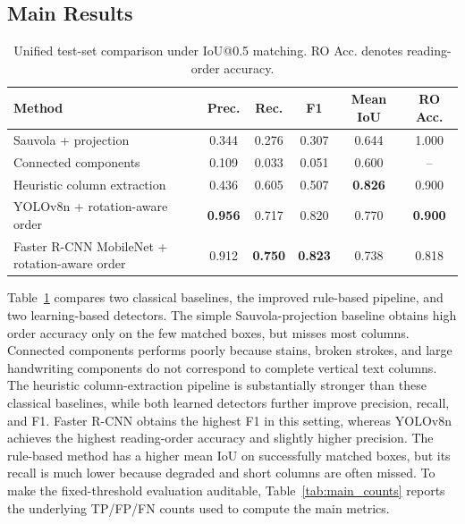 \documentclass[pdflatex,sn-mathphys-num]{sn-jnl}
\begin{document}
\subsection{Main Results}
\begin{table}
\centering
\scriptsize\setlength{\tabcolsep}{3pt}
\caption{Unified test-set comparison under IoU@0.5 matching. RO Acc. denotes reading-order accuracy.}
\label{tab:main_results}
\begin{tabular}{lccccc}
\toprule
Method & Prec. & Rec. & F1 & Mean IoU & RO Acc. \\
\midrule
Sauvola + projection & 0.344 & 0.276 & 0.307 & 0.644 & 1.000 \\
Connected components & 0.109 & 0.033 & 0.051 & 0.600 & -- \\
Heuristic column extraction & 0.436 & 0.605 & 0.507 & \textbf{0.826} & 0.900 \\
YOLOv8n + rotation-aware order & \textbf{0.956} & 0.717 & 0.820 & 0.770 & \textbf{0.900} \\
Faster R-CNN MobileNet + rotation-aware order & 0.912 & \textbf{0.750} & \textbf{0.823} & 0.738 & 0.818 \\
\bottomrule
\end{tabular}
\end{table}

Table~\ref{tab:main_results} compares two classical baselines, the improved rule-based pipeline, and two learning-based detectors. The simple Sauvola-projection baseline obtains high order accuracy only on the few matched boxes, but misses most columns. Connected components performs poorly because stains, broken strokes, and large handwriting components do not correspond to complete vertical text columns. The heuristic column-extraction pipeline is substantially stronger than these classical baselines, while both learned detectors further improve precision, recall, and F1. Faster R-CNN obtains the highest F1 in this setting, whereas YOLOv8n achieves the highest reading-order accuracy and slightly higher precision. The rule-based method has a higher mean IoU on successfully matched boxes, but its recall is much lower because degraded and short columns are often missed. To make the fixed-threshold evaluation auditable, Table~\ref{tab:main_counts} reports the underlying TP/FP/FN counts used to compute the main metrics.
\end{document}
